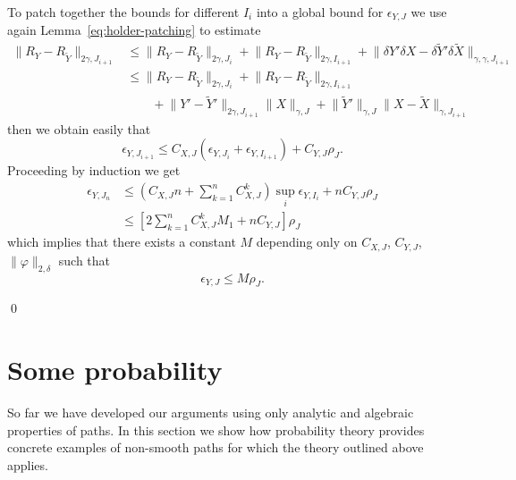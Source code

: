 \documentclass[a4paper,12pt,reqno]{amsproc}
\newcommand{\der}{\delta\!}
\newcommand{\norm}[1]{\lVert #1\rVert}
\newcommand{\wt}{\widetilde}
\begin{document}
To patch together the bounds for different $I_i$ into a global bound
for $\epsilon_{Y,J}$ we use again
 Lemma~\ref{eq:holder-patching}  to estimate
\begin{equation*}
  \begin{split}
 \norm{R_Y-R_{\wt Y}}_{2\gamma,J_{i+1}} & \le \norm{R_Y-R_{\wt
 Y}}_{2\gamma,J_{i}}+\norm{R_Y-R_{\wt Y}}_{2\gamma,I_{i+1}}+\norm{\der
 Y' \der X - \der \wt Y' \der \wt X}_{\gamma,\gamma,J_{i+1}}   
\\ & \le  \norm{R_Y-R_{\wt
 Y}}_{2\gamma,J_{i}}+\norm{R_Y-R_{\wt Y}}_{2\gamma,I_{i+1}}
\\ & \qquad + \norm{
 Y'-\wt Y'}_{2\gamma,J_{i+1}} \norm{  X}_{\gamma,J} + \norm{ \wt
 Y'}_{\gamma,J} \norm{ X- \wt X}_{\gamma,J_{i+1}} 
  \end{split}
\end{equation*}
then we obtain easily that
\begin{equation*}
  \epsilon_{Y,J_{i+1}} \le C_{X,J}
  (\epsilon_{Y,J_{i}}+\epsilon_{Y,I_{i+1}} ) + C_{Y,J} \rho_J.
\end{equation*}
Proceeding by induction we get
\begin{equation*}
  \begin{split}
  \epsilon_{Y,J_{n}} & \le (C_{X,J} n + \sum_{k=1}^n C_{X,J}^k) \sup_i \epsilon_{Y,I_{i}}
  + n C_{Y,J} \rho_J \\ & \le [ 2 \sum_{k=1}^n C_{X,J}^k
   M_1 + n
  C_{Y,J}] \rho_J    
  \end{split}
\end{equation*}
which implies that  there exists a constant $M$ depending only on $C_{X,J}$,
$C_{Y,J}$, $\norm{\varphi}_{2,\delta}$ such that
$$
\epsilon_{Y,J} \le M \rho_{J}.
$$

\qed



\section{Some probability}
\label{sec:probability}
So far we have developed our arguments using only analytic and
algebraic properties of paths. In this section we  show how
probability theory provides concrete examples of non-smooth paths for which the
theory outlined above applies.  
 
\end{document}
